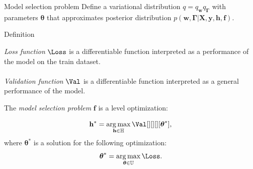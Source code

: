 \documentclass[usenames,dvipsnames,11pt,pdf,utf8,russian,aspectratio=43]{beamer}
\DeclareMathOperator*{\argmax}{arg\,max}
\begin{document}
\begin{frame}{Model selection problem}
\footnotesize
Define a variational distribution $q=q_\mathbf{w}q_{\boldsymbol{\Gamma}}$ with parameters $\boldsymbol{\theta}$ that approximates posterior distribution $p(\mathbf{w}, \boldsymbol{\Gamma}|\mathbf{X}, \mathbf{y}, \mathbf{h}, \mathbf{f})$.



\begin{block}{Definition}

\textit{Loss function} $\Loss$ is a differentiable function interpreted as a performance of the model on the train dataset.~\\~\\
\textit{Validation function} $\Val$  is a differentiable function  interpreted as a general performance of the model.
\end{block}
\begin{block}{}
The \textit{model selection problem} $\mathbf{f}$ is a level optimization:

\[
	\mathbf{h}^{*} = \argmax_{\mathbf{h} \in \mathbb{H}} \Val[][][][\teta^{*}],
\]
where $\boldsymbol{\theta}^{*}$ is a solution for the following optimization:
\[
   \boldsymbol{\theta}^{*} = \argmax_{\boldsymbol{\theta} \in \mathbb{U}} \Loss.
\]
\end{block}


\end{frame}







                                                                                                              
\end{document}
